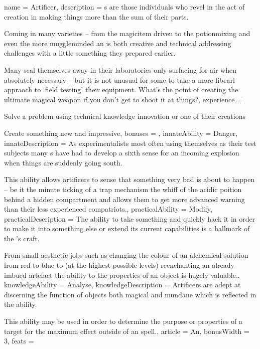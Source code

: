 \archetype
{
	name = Artificer,
	description = {\bname{}}s are those individuals who revel in the act of creation\comma{} in making things more than the sum of their parts. 

Coming in many varieties – from the magic\minus{}item driven  to the potion\minus{}mixing  and even the more muggle\minus{}minded \comma{} an  is both creative and technical\comma{} addressing challenges with a little something they prepared earlier. 

Many  seal themselves away in their laboratories\comma{} only surfacing for air when absolutely necessary – but it is not unusual for some to take a more libearl appraoch to `field testing’ their equipment. What’s the point of creating the ultimate magical weapon if you don’t get to shoot it at things?,
	experience = \item Solve a problem using technical knowledge\comma{} innovation or one of their creations
\item Create something new and impressive,
	bonuses = 
,
	innateAbility = Danger,
	innateDescription = As experimentalists\comma{} most often using themselves as their test subjects\comma{} many {\bname{}}s have had to develop a sixth sense for an incoming explosion when things are suddenly going south. 

This ability allows artificers to sense that something very bad is about to happen – be it the minute ticking of a trap mechanism\comma{} the whiff of the acidic poition behind a hidden compartment\comma{} and allows them to get more advanced warning than their less experienced compatriots.,
	practicalAbility = Modify,
	practicalDescription = The ability to take something and quickly hack it in order to make it into something else\comma{} or extend its current capabilities\comma{} is a hallmark of the \bname{}’s craft. 

From small aesthetic jobs\comma{} such as changing the colour of an alchemical solution from red to blue\comma{} to (at the highest possible levels)\comma{} re\minus{}enchanting an already imbued artefact\comma{} the ability to  the properties of an object is hugely valuable.,
	knowledgeAbility = Analyse,
	knowledgeDescription = Artificers are adept at discerning the function of objects\comma{} both magical and mundane\comma{} which is reflected in the  ability. 

This ability may be used in order to determine the purpose or properties of a target for the maximum effect outside of an  spell.,
	article = An,
	bonusWidth = 3, feats = \ArtificerFeats
}

